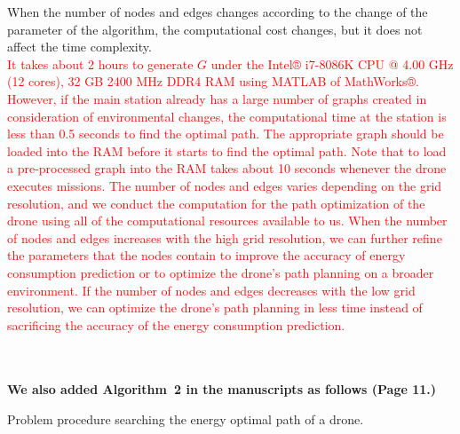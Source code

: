 \documentclass[onecolumn]{IEEEconf}
\begin{document}
\begin{description}
\begin{mdframed} [linewidth=.75pt, userdefinedwidth=0.9\textwidth]
{\begin{equation*}
    \end{equation*}
    When the number of nodes and edges changes according to the change of the parameter of the algorithm, the computational cost changes, but it does not affect the time complexity.
    }
    ~\\
    \textcolor{red}{
    It takes about 2 hours to generate $G$ under the Intel® i7-8086K CPU @ 4.00 GHz (12 cores), 32 GB 2400 MHz DDR4 RAM using MATLAB of MathWorks®. 
    However, if the main station already has a large number of graphs created in consideration of environmental changes, the computational time at the station is less than 0.5 seconds to find the optimal path. The appropriate graph should be loaded into the RAM before it starts to find the optimal path. Note that to load a pre-processed graph into the RAM takes about 10 seconds whenever the drone executes missions. 
    The number of nodes and edges varies depending on the grid resolution, and we conduct the computation for the path optimization of the drone using all of the computational resources available to us. When the number of nodes and edges increases with the high grid resolution, we can further refine the parameters that the nodes contain to improve the accuracy of energy consumption prediction or to optimize the drone’s path planning on a broader environment.
    If the number of nodes and edges decreases with the low grid resolution, we can optimize the drone’s path planning in less time instead of sacrificing the accuracy of the energy consumption prediction.}
    \end{mdframed}
    ~\\
    ~\pagebreak ~
    ~\\
	\textbf{We also added Algorithm~2 in the manuscripts as follows (Page 11.)}~\\
	\SetNlSty{}{\color{red}}{:}
    \SetAlFnt{\color{red}}
    \setcounter{algocf}{1}
    \begin{algorithm}[h]
    \caption{Problem procedure searching the energy optimal path of a drone.}
    \KwIn{\\
    \hskip1.5em $G$ // A created graph  \\
    \hskip1.5em $n_s$ // A source node  \\
    \hskip1.5em $n_d$ // A destination node 
    }

\end{algorithm}
\end{description}
\end{document}
